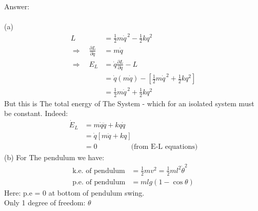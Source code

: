 \documentclass[12pt]{article}
\begin{document}
\newpage
\noindent
Answer: \\
\\
(a) \begin{align*}
L &= \frac{1}{2}m\dot{q}^{\,2}-\frac{1}{2}kq^2\\
\Rightarrow\quad \frac{\partial L}{\partial \dot{q}} &= m\dot{q}\\
\Rightarrow\quad E_L &= \dot{q}\frac{\partial L}{\partial \dot{q}}-L\\
&= \dot{q}(m\dot{q})-\left[\frac{1}{2}m\dot{q}^{\,2}+\frac{1}{2}kq^2\right]\\
&= \frac{1}{2}m\dot{q}^{\,2}+\frac{1}{2}kq^2
\end{align*}
But this is The total energy of The System - which
for an isolated system must be constant.  Indeed:
\begin{align*}
\dot{E}_L &= m \dot{q} \ddot{q} + kq \dot{q} \\
&= \dot{q} [m \ddot{q} + kq] \\
&= 0 \;\;\;\;\;\;\;\;\;\;\;\;\;\;\;\;\; \text{(from E-L equations)}
\end{align*}
(b) For The pendulum we have:
\begin{align*}
\text{k.e. of pendulum} &= \frac{1}{2}mv^2
= \frac{1}{2}ml^2\dot{\theta}^2\\
\text{p.e. of pendulum} &= mlg(1-\cos\theta)
\end{align*}
Here: p.e = 0 at bottom of pendulum swing. \\
Only 1 degree of freedom: $\theta$
\end{document}
